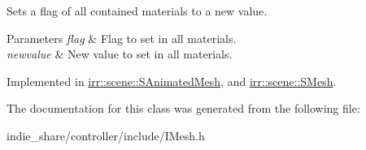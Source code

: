 Sets a flag of all contained materials to a new value. 


\begin{DoxyParams}{Parameters}
{\em flag} & Flag to set in all materials. \\
\hline
{\em newvalue} & New value to set in all materials. \\
\hline
\end{DoxyParams}


Implemented in \hyperlink{structirr_1_1scene_1_1SAnimatedMesh_aefe38066b9c38c6d4ea522b5d988769e}{irr\+::scene\+::\+S\+Animated\+Mesh}, and \hyperlink{structirr_1_1scene_1_1SMesh_a0ca30440aef6ca66dfc177b2a0e41e52}{irr\+::scene\+::\+S\+Mesh}.



The documentation for this class was generated from the following file\+:\begin{DoxyCompactItemize}
\item 
indie\+\_\+share/controller/include/I\+Mesh.\+h\end{DoxyCompactItemize}
